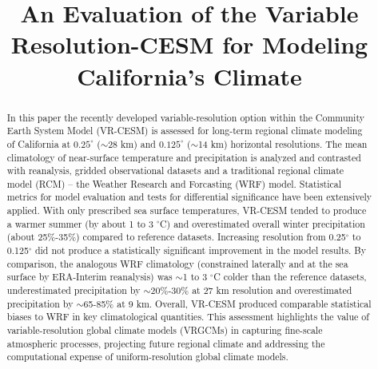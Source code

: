 \documentclass[ms,draft]{agutex}   %
\begin{document}
%
%


\title{An Evaluation of the Variable Resolution-CESM for Modeling California's Climate}




%

\begin{abstract}

In this paper the recently developed variable-resolution option within the Community Earth System Model (VR-CESM) is assessed for long-term regional climate modeling of California at $0.25^\circ$ ($\sim$28 km) and $0.125^\circ$ ($\sim$14 km) horizontal resolutions. The mean climatology of near-surface temperature and precipitation is analyzed and contrasted with reanalysis, gridded observational datasets and a traditional regional climate model (RCM) -- the Weather Research and Forcasting (WRF) model. Statistical metrics for model evaluation and tests for differential significance have been extensively applied. With only prescribed sea surface temperatures, VR-CESM tended to produce a warmer summer (by about 1 to 3 $^\circ$C) and overestimated overall winter precipitation (about 25$\%$-35$\%$) compared to reference datasets. Increasing resolution from 0.25$^\circ$ to 0.125$^\circ$ did not produce a statistically significant improvement in the model results. By comparison, the analogous WRF climatology (constrained laterally and at the sea surface by ERA-Interim reanalysis) was $\sim$1 to 3 $^\circ$C colder than the reference datasets, underestimated precipitation by $\sim$20$\%$-30$\%$ at 27 km resolution and overestimated precipitation by $\sim$65-85$\%$ at 9 km.  Overall, VR-CESM produced comparable statistical biases to WRF in key climatological quantities.  This assessment highlights the value of variable-resolution global climate models (VRGCMs) in capturing fine-scale atmospheric processes, projecting future regional climate and addressing the computational expense of uniform-resolution global climate models.

\end{abstract} 
\end{document}
